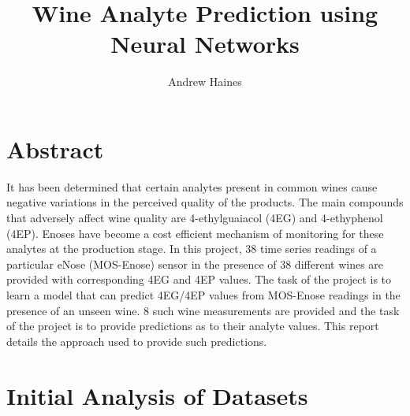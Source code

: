 \documentclass[twocolumn]{article}
\author{Andrew Haines}
\title{Wine Analyte Prediction using Neural Networks}
\begin{document}
\maketitle
\section{Abstract}

It has been determined that certain analytes present in common wines cause negative variations in the perceived
quality of the products. The main compounds that adversely affect wine quality are 4-ethylguaiacol (4EG) and
4-ethyphenol (4EP). Enoses have become a cost efficient mechanism of monitoring for these analytes at the production
stage\cite{wineSpoilage}. In this project, 38 time series readings of a particular eNose (MOS-Enose) sensor in the presence 
of 38 different wines are provided with corresponding 4EG and 4EP values. The task of the project is to learn
a model that can predict 4EG/4EP values from MOS-Enose readings in the presence of an unseen wine. 8 such wine
measurements are provided and the task of the project is to provide predictions as to their analyte values.
This report details the approach used to provide such predictions.

\section{Initial Analysis of Datasets}
\end{document}
